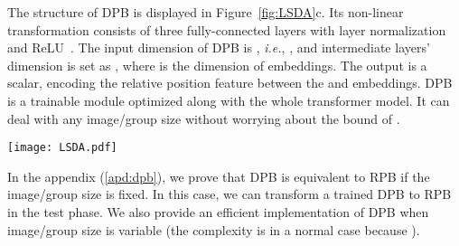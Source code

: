 \documentclass{article} \usepackage{iclr2022_conference,times}
\newcommand{\ie}{{\emph{i.e.}}}
\begin{document}
The structure of DPB is displayed in Figure~\ref{fig:LSDA}c. Its non-linear transformation consists of three fully-connected layers with layer normalization~\citep{DBLP:journals/corr/BaKH16} and ReLU~\citep{DBLP:conf/icml/NairH10}.
The input dimension of DPB is , \ie, , and intermediate layers' dimension is set as , where  is the dimension of embeddings. The output  is a scalar, encoding the relative position feature between the  and  embeddings.
DPB is a trainable module optimized along with the whole transformer model. It can deal with any image/group size without worrying about the bound of .
\begin{figure*}[t]
    \centering
    \texttt{[image: LSDA.pdf]}
    \caption{
        (a) Short distance attention (SDA). Embeddings (blue cubes) are grouped by red boxes.
        (b) Long distance attention (LDA). Embeddings with the same color borders belong to the same group. Large patches of embeddings in the same group are adjacent.
        (c) Dynamic position bias (DBP). The dimensions of intermediate layers are , and the output is a scalar.}
    \label{fig:LSDA}
    \vspace{-3mm}
\end{figure*}
In the appendix (\ref{apd:dpb}), we prove that DPB is equivalent to RPB if the image/group size is fixed. In this case, we can transform a trained DPB to RPB in the test phase. We also provide an efficient  implementation of DPB when image/group size is variable (the complexity is  in a normal case because ).
\end{document}
